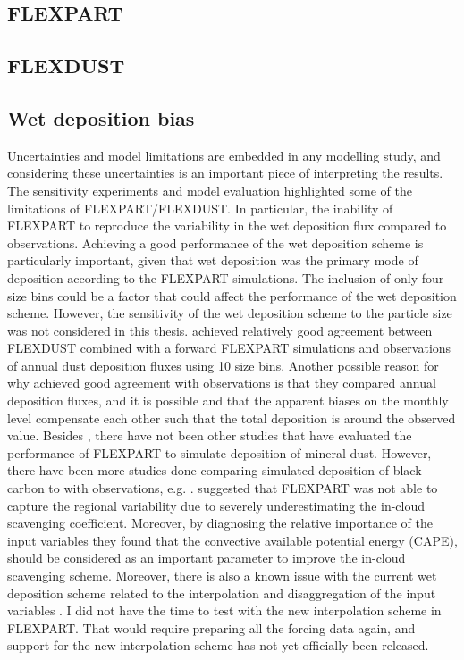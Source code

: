 \subsection{FLEXPART}
\subsection{FLEXDUST}
\subsection{Wet deposition bias}\label{sec:model_uncertainties}
Uncertainties and model limitations are embedded in any modelling study, and considering these uncertainties is an important piece of interpreting the results.  
The sensitivity experiments and model evaluation highlighted some of the limitations of FLEXPART/FLEXDUST. 
In particular, the inability of FLEXPART to reproduce the variability in the wet deposition flux compared to observations. 
Achieving a good performance of the wet deposition scheme is particularly important, given that wet deposition was the primary mode of deposition according to the FLEXPART simulations. 
The inclusion of only four size bins could be a factor that could affect the performance of the wet deposition scheme.
However, the sensitivity of the wet deposition scheme to the particle size was not considered in this thesis.
\textcite{flexdust_ref_2016} achieved relatively good agreement between FLEXDUST combined with a forward FLEXPART simulations and observations of annual dust deposition fluxes using 10 size bins. 
Another possible reason for why \textcite{flexdust_ref_2016} achieved good agreement with observations is that they compared annual deposition fluxes, and it is possible and that the apparent biases on the monthly level compensate each other such that the total deposition is around the observed value. 
Besides \textcite{flexdust_ref_2016}, there have not been other studies that have evaluated the performance of FLEXPART to simulate deposition of mineral dust.
However, there have been more studies done comparing simulated deposition of black carbon to with observations, e.g. \textcite{flexpart_wetdep, choi_investigation_2020}. 
\textcite{choi_investigation_2020} suggested that FLEXPART was not able to capture the regional variability due to severely underestimating the in-cloud scavenging coefficient. Moreover, by diagnosing the relative importance of the input variables 
they found that the convective available potential energy (CAPE), should be considered as an important parameter to improve the in-cloud scavenging scheme. 
Moreover, there is also a known issue with the current wet deposition scheme related to the interpolation and disaggregation of the input variables \parencite{tipka2021effects}. 
I did not have the time to test with the new interpolation scheme in FLEXPART. 
That would require preparing all the forcing data again, and support for the new interpolation scheme has not yet officially been released.

